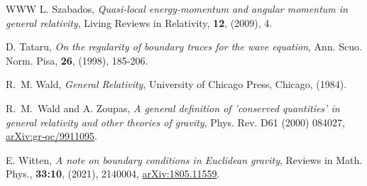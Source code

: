 \documentclass[10pt]{amsart}
\newcommand{\<}{\langle}
\renewcommand{\>}{\rangle}
\theoremstyle{plain}
\theoremstyle{remark}
\theoremstyle{definition}
\numberwithin{equation}{section}
\begin{document}
\begin{thebibliography}{WWW}
 L. Szabados, {\it Quasi-local energy-momentum and angular momentum in general relativity}, 
Living Reviews in Relativity, {\bf 12}, (2009), 4. 

 D. Tataru, {\it On the regularity of boundary traces for the wave equation}, Ann. Scuo. Norm. Pisa, {\bf 26}, 
(1998), 185-206. 

 R.~M. Wald, {\it General Relativity}, University of Chicago Press, Chicago, (1984). 

 R.~M.~Wald and A. Zoupas, {\it A general definition of 'conserved quantities' in general
relativity and other theories of gravity}, Phys. Rev. D61 (2000) 084027, \href{https://arXiv.org/abs/gr-qc/9911095}{arXiv:gr-qc/9911095}. 

 E. Witten, {\it A note on boundary conditions in Euclidean gravity}, Reviews in Math. Phys., {\bf 33:10}, (2021), 
2140004, \href{https://arXiv.org/abs/1805.11559}{arXiv:1805.11559}. 



\end{thebibliography} 
\end{document}
